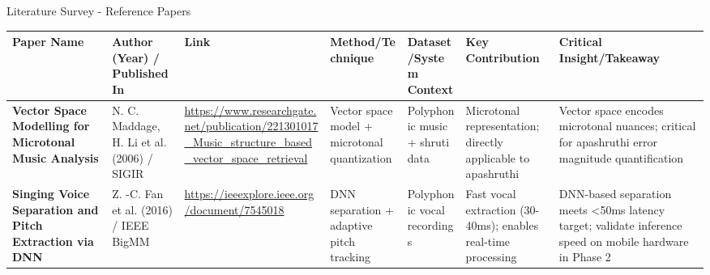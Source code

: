 \documentclass[aspectratio=169,11pt]{beamer}
\begin{document}
\begin{frame}[allowframebreaks]{Literature Survey - Reference Papers}
		\framebreak
		
		{\tiny
			\begin{longtable}{p{1.6cm}|p{1.3cm}|p{1.5cm}|p{1.6cm}|p{1.6cm}|p{1.6cm}|p{1.8cm}}
				\toprule
				\textbf{Paper Name} & \textbf{Author (Year) / Published In} & \textbf{Link} & \textbf{Method/Technique} & \textbf{Dataset/System Context} & \textbf{Key Contribution} & \textbf{Critical Insight/Takeaway} \\
				\midrule
				
				\textbf{Vector Space Modelling for Microtonal Music Analysis} & N. C. Maddage, H. Li et al. (2006) / SIGIR & \url{https://www.researchgate.net/publication/221301017_Music_structure_based_vector_space_retrieval} & Vector space model + microtonal quantization & Polyphonic music + shruti data & Microtonal representation; directly applicable to apashruthi & Vector space encodes microtonal nuances; critical for apashruthi error magnitude quantification \\
				\addlinespace
				
				\textbf{Singing Voice Separation and Pitch Extraction via DNN} & Z. -C. Fan et al. (2016) / IEEE BigMM & \url{https://ieeexplore.ieee.org/document/7545018} & DNN separation + adaptive pitch tracking & Polyphonic vocal recordings & Fast vocal extraction (30-40ms); enables real-time processing & DNN-based separation meets <50ms latency target; validate inference speed on mobile hardware in Phase 2 \\
				\bottomrule
			\end{longtable}
		}
		
	\end{frame}
	
\end{document}
